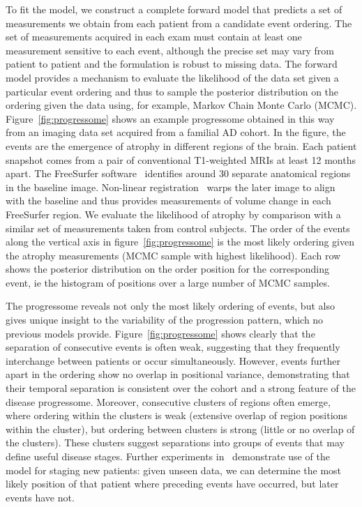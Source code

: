 \documentclass[a4paper,11pt]{article}
\begin{document}
To fit the model, we construct a complete forward model that predicts
a set of measurements we obtain from each patient from a candidate
event ordering.  The set of measurements acquired in each exam must
contain at least one measurement sensitive to each event, although the
precise set may vary from patient to patient and the formulation is
robust to missing data.  The forward model provides a mechanism to
evaluate the likelihood of the data set given a particular event
ordering and thus to sample the posterior distribution on the ordering
given the data using, for example, Markov Chain Monte Carlo (MCMC).
Figure~\ref{fig:progressome} shows an example progressome obtained in
this way from an imaging data set acquired from a familial AD cohort.
In the figure, the events are the emergence of atrophy in different
regions of the brain.  Each patient snapshot comes from a pair of
conventional T1-weighted MRIs at least 12 months apart.  The
FreeSurfer software~\cite{FischlNeuron02} identifies around 30 separate
anatomical regions in the baseline image.  Non-linear
registration~\cite{ModatCMPB10} warps the later image to align with the
baseline and thus provides measurements of volume change in each
FreeSurfer region.  We evaluate the likelihood of atrophy by
comparison with a similar set of measurements taken from control
subjects.  The order of the events along the vertical axis in
figure~\ref{fig:progressome} is the most likely ordering given the
atrophy measurements (MCMC sample with highest likelihood).  Each row
shows the posterior distribution on the order position for the
corresponding event, ie the histogram of positions over a large number
of MCMC samples.

The progressome reveals not only the most likely ordering of events,
but also gives unique insight to the variability of the progression
pattern, which no previous models
provide. Figure~\ref{fig:progressome} shows clearly that the
separation of consecutive events is often weak, suggesting that they
frequently interchange between patients or occur
simultaneously. However, events further apart in the ordering show no
overlap in positional variance, demonstrating that their temporal
separation is consistent over the cohort and a strong feature of the
disease progressome. Moreover, consecutive clusters of regions often
emerge, where ordering within the clusters is weak (extensive overlap
of region positions within the cluster), but ordering between clusters
is strong (little or no overlap of the clusters). These clusters
suggest separations into groups of events that may define useful
disease stages.  Further experiments in~\cite{FonteijnScience11}
demonstrate use of the model for staging new patients: given unseen
data, we can determine the most likely position of that patient where
preceding events have occurred, but later events have not.
\end{document}
